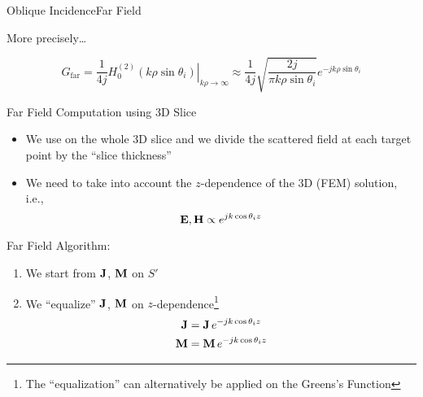 \begin{frame}[allowframebreaks]{Oblique Incidence}{Far Field}
\begin{block}{More precisely\ldots}
\begin{itemize}
      \begin{equation*}
        G_\text{far} = \dfrac{1}{4j}
        \left.
          H_0^{(2)}\left( k\rho\sin\theta_i\right)
        \right|_{k\rho\rightarrow\infty} \approx
         \dfrac{1}{4j} \sqrt{\dfrac{2j}{\pi k\rho\sin\theta_i}}
        e^{-j k \rho \sin\theta_i}
      \end{equation*}
      
    \end{itemize}

  \end{block}

  \framebreak %
  
  \begin{block}{Far Field Computation using 3D Slice}
    \begin{itemize}
    \item We use {\GreenD} on the whole 3D slice and we divide the
      scattered field at each target point by the ``slice thickness''
      
    \item We need to take into account the $z$-dependence of the
      3D (FEM) solution, i.e.,
      \begin{equation*}
        \mathbf{E},\mathbf{H} \propto   e^{j k \cos\theta_i z}
      \end{equation*}
      
    \end{itemize}

  \end{block}
  
  \framebreak %
  
  \begin{block}{Far Field Algorithm:}
  \end{block}
  
    \begin{enumerate}
    \item We start from $\mathbf{J}$, $\mathbf{M}$ on $S'$

    \item We ``equalize'' $\mathbf{J}$, $\mathbf{M}$ on $z$-dependence\footnote{The
        ``equalization'' can alternatively be applied on the Greens's
        Function}
       \begin{align*}
         \mathbf{J} &= \mathbf{J} \, e^{-j k \cos\theta_i z} \\
         \mathbf{M} &= \mathbf{M} \, e^{-j k \cos\theta_i z} 
       \end{align*}


\end{enumerate}
\end{frame}
